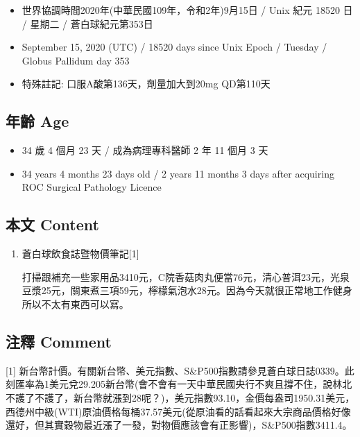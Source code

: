 \documentclass[a5paper, 11pt
]{book}
\providecommand{\tightlist}{%
  \setlength{\itemsep}{0pt}\setlength{\parskip}{0pt}}
\begin{document}
\begin{itemize}
\tightlist
\item
  世界協調時間2020年(中華民國109年，令和2年)9月15日 / Unix 紀元 18520 日
  / 星期二 / 蒼白球紀元第353日
\item
  September 15, 2020 (UTC) / 18520 days since Unix Epoch / Tuesday /
  Globus Pallidum day 353
\item
  特殊註記: 口服A酸第136天，劑量加大到20mg QD第110天
\end{itemize}

\hypertarget{ux5e74ux9f61-age-14}{%
\subsection{年齡 Age}\label{ux5e74ux9f61-age-14}}

\begin{itemize}
\tightlist
\item
  34 歲 4 個月 23 天 / 成為病理專科醫師 2 年 11 個月 3 天
\item
  34 years 4 months 23 days old / 2 years 11 months 3 days after
  acquiring ROC Surgical Pathology Licence
\end{itemize}

\hypertarget{ux672cux6587-content-14}{%
\subsection{本文 Content}\label{ux672cux6587-content-14}}

\begin{enumerate}
\def\labelenumi{\arabic{enumi}.}
\item
  蒼白球飲食誌暨物價筆記{[}1{]}

  打掃跟補充一些家用品3410元，C院香菇肉丸便當76元，清心普洱23元，光泉豆漿25元，關東煮三項59元，檸檬氣泡水28元。因為今天就很正常地工作健身所以不太有東西可以寫。
\end{enumerate}

\hypertarget{ux6ce8ux91cb-comment-14}{%
\subsection{注釋 Comment}\label{ux6ce8ux91cb-comment-14}}

{[}1{]}
新台幣計價。有關新台幣、美元指數、S\&P500指數請參見蒼白球日誌0339。此刻匯率為1美元兌29.205新台幣(會不會有一天中華民國央行不爽且撐不住，說林北不護了不護了，新台幣就漲到28呢？)，美元指數93.10，金價每盎司1950.31美元，西德州中級(WTI)原油價格每桶37.57美元(從原油看的話看起來大宗商品價格好像還好，但其實穀物最近漲了一發，對物價應該會有正影響)，S\&P500指數3411.4。
\end{document}
